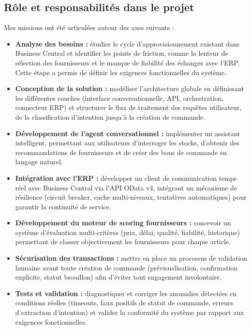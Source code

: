 \subsection{Rôle et responsabilités dans le projet}
Mes missions ont été articulées autour des axes suivants :
\begin{itemize}
    \item \textbf{Analyse des besoins :} étudier le cycle d'approvisionnement existant dans Business Central et identifier les points de friction, comme la lenteur de sélection des fournisseurs et le manque de fiabilité des échanges avec l'ERP. Cette étape a permis de définir les exigences fonctionnelles du système.

    \item \textbf{Conception de la solution :} modéliser l'architecture globale en définissant les différentes couches (interface conversationnelle, API, orchestration, connecteur ERP) et structurer le flux de traitement des requêtes utilisateur, de la classification d'intention jusqu'à la création de commande.

    \item \textbf{Développement de l'agent conversationnel :} implémenter un assistant intelligent, permettant aux utilisateurs d'interroger les stocks, d'obtenir des recommandations de fournisseurs et de créer des bons de commande en langage naturel.

    \item \textbf{Intégration avec l'ERP :} développer un client de communication temps réel avec Business Central via l'API OData v4, intégrant un mécanisme de résilience (circuit breaker, cache multi-niveaux, tentatives automatiques) pour garantir la continuité de service.

    \item \textbf{Développement du moteur de scoring fournisseurs :} concevoir un système d'évaluation multi-critères (prix, délai, qualité, fiabilité, historique) permettant de classer objectivement les fournisseurs pour chaque article.

    \item \textbf{Sécurisation des transactions :} mettre en place un processus de validation humaine avant toute création de commande (prévisualisation, confirmation explicite, statut brouillon) afin d'éviter tout engagement involontaire.

    \item \textbf{Tests et validation :} diagnostiquer et corriger les anomalies détectées en conditions réelles (timeouts, faux positifs de statut de commande, erreurs d'extraction d'intention) et valider la conformité du système par rapport aux exigences fonctionnelles.
\end{itemize}

